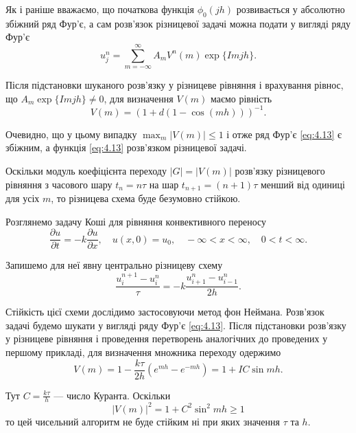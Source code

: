 Як і раніше вважаємо, що початкова функція $\phi_0(jh)$ розвивається у абсолютно збіжний ряд Фур'є, а сам розв'язок різницевої задачі можна подати у вигляді ряду Фур'є
\begin{equation}
    \label{eq:4.13}
    u_j^n = \sum_{m = -\infty}^\infty A_m V^n(m) \exp\{Imjh\}.
\end{equation}

Після підстановки шуканого розв'язку у різницеве рівняння і врахування рівнос, що $A_m \exp\{Imjh\} \ne 0$, для визначення $V(m)$ маємо рівність
\begin{equation*}
    V(m) = (1 + d(1 - \cos(mh)))^{-1}.
\end{equation*}

Очевидно, що у цьому випадку $\max_m |V(m)| \le 1$ і отже ряд Фур'є \eqref{eq:4.13} є збіжним, а функція \eqref{eq:4.13} розв'язком різницевої задачі. \medskip

Оскільки модуль коефіцієнта переходу $|G| = |V(m)|$ розв'язку різницевого рівняння з часового шару $t_n = n \tau$ на шар $t_{n+1} = (n + 1) \tau$ менший від одиниці для усіх $m$, то різницева схема буде безумовно стійкою. 

\begin{example}
    Розглянемо задачу Коші для рівняння конвективного переносу
	\begin{equation*}
	    \frac{\partial u}{\partial t} = -k \frac{\partial u}{\partial x}, \quad u(x, 0) = u_0, \quad - \infty < x < \infty, \quad 0 < t < \infty. 
	\end{equation*} 
\end{example}

Запишемо для неї явну центрально різницеву схему 
\begin{equation*}
    \frac{u_i^{n + 1} - u_i^n}{\tau} = -k \frac{u_{i + 1}^n - u_{i - 1}^n}{2 h}.
\end{equation*}

Стійкість цієї схеми дослідимо застосовуючи метод фон Неймана. Розв'язок задачі будемо шукати у вигляді ряду Фур'є \eqref{eq:4.13}. Після підстановки розв'язку у різницеве рівняння і проведення перетворень аналогічних до проведених у першому прикладі, для визначення множника переходу одержимо 
\begin{equation*}
    V(m) = 1 - \frac{k \tau}{2 h} (e^{mh} - e^{-mh}) = 1 + IC \sin mh.
\end{equation*}

Тут $C = \frac{k \tau}{h}$ --- число Куранта. Оскільки 
\begin{equation*}
    |V(m)|^2 = 1 + C^2 \sin^2 mh \ge 1
\end{equation*}
то цей чисельний алгоритм не буде стійким ні при яких значення $\tau$ та $h$.

